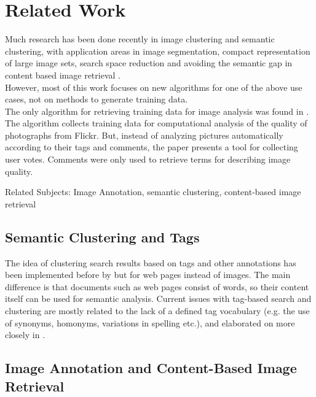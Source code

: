\section{Related Work}
\label{sec_relatedwork}

Much research has been done recently in image clustering and semantic clustering, with application areas in image segmentation, compact representation of large image sets, search space reduction and avoiding the semantic gap in content based image retrieval \cite{Lim2011}. \\
However, most of this work focuses on new algorithms for one of the above use cases, not on methods to generate training data. \\

The only algorithm for retrieving training data for image analysis was found in \cite{Orendovici2010}. The algorithm collects training data for computational analysis of the quality of photographs from Flickr. But, instead of analyzing pictures automatically according to their tags and comments, the paper presents a tool for collecting user votes. Comments were only used to retrieve terms for describing image quality.

Related Subjects: Image Annotation, semantic clustering, content-based image retrieval

\subsection{Semantic Clustering and Tags}
The idea of clustering search results based on tags and other annotations has been implemented before by \cite{Ramage2009} but for web pages instead of images. The main difference is that documents such as web pages consist of words, so their content itself can be used for semantic analysis.
Current issues with tag-based search and clustering are mostly related to the lack of a defined tag vocabulary (e.g. the use of synonyms, homonyms, variations in spelling etc.), and elaborated on more closely in \cite{Auer2011}.

\subsection{Image Annotation and Content-Based Image Retrieval}

